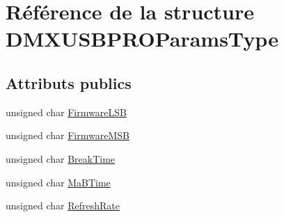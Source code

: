 \hypertarget{struct_d_m_x_u_s_b_p_r_o_params_type}{\section{Référence de la structure D\+M\+X\+U\+S\+B\+P\+R\+O\+Params\+Type}
\label{struct_d_m_x_u_s_b_p_r_o_params_type}
}
\subsection*{Attributs publics}
\begin{DoxyCompactItemize}
\item 
unsigned char \hyperlink{struct_d_m_x_u_s_b_p_r_o_params_type_aafb2113e09068d2c2d90d4254e57e580}{Firmware\+L\+S\+B}
\item 
unsigned char \hyperlink{struct_d_m_x_u_s_b_p_r_o_params_type_a545afd72b346f85996c1ae3d0b35a0ef}{Firmware\+M\+S\+B}
\item 
unsigned char \hyperlink{struct_d_m_x_u_s_b_p_r_o_params_type_a86773af46c2e39c7b260ce1f09ca0a36}{Break\+Time}
\item 
unsigned char \hyperlink{struct_d_m_x_u_s_b_p_r_o_params_type_a1ab62801637fe44bba062f2bfa54e38e}{Ma\+B\+Time}
\item 
unsigned char \hyperlink{struct_d_m_x_u_s_b_p_r_o_params_type_a6258e9923d9bc0725d4b2cc0be515d70}{Refresh\+Rate}
\end{DoxyCompactItemize}


